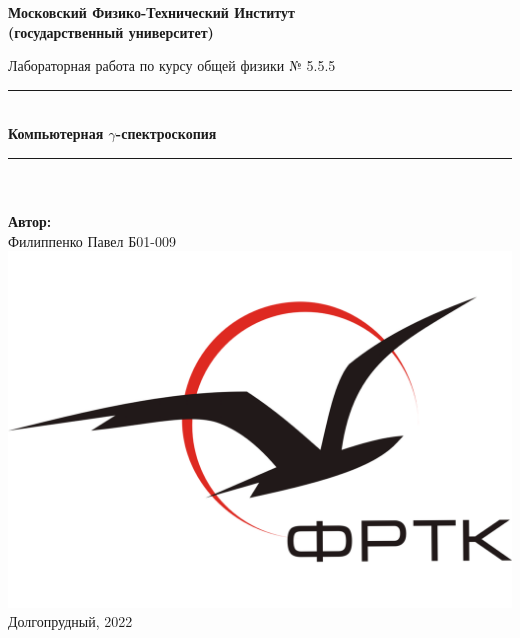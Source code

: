 \newcommand{\HRule}{\rule{\linewidth}{0.7mm}} %
	
	\begin{center}
		\large\textbf{Московский Физико-Технический Институт}\\ %
		\large\textbf{(государственный университет)}
	
		\vfill
		
		\Large Лабораторная работа по курсу общей физики № 5.5.5\\[0.5cm] %
		
		
		\HRule
		\\[0.4cm]
		{ \huge \bfseries Компьютерная $\gamma$-спектроскопия}%
		\\[0.4cm] 
		\HRule
		\\[0.5cm]
		
		\ \\
	\textbf{\large Автор:} \\	
	\large Филиппенко Павел Б01-009\\ %
		\vfill
		\hspace*{-0.8 cm}\includegraphics[width=100 pt]{../images/frkt_logo}\\ %
		\large Долгопрудный, 2022 %
	\end{center}

\newpage
\setcounter{page}{2}
\fancyfoot[c]{\thepage}
\fancyhead[R]{}
